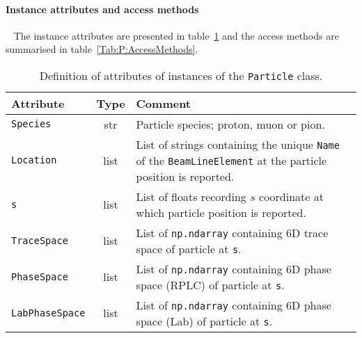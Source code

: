 \paragraph{Instance attributes and access methods} ~\newline
\label{Para:BLE:InstAttr}
\noindent
The instance attributes are presented in table~\ref{Tab:P:Attributes}
and the access methods are summarised in table~\ref{Tab:P:AccessMethods}.
\begin{table}[h]
  \caption{
    Definition of attributes of instances of the \texttt{Particle} class.
  }
  \label{Tab:P:Attributes}
  \begin{center}
    \begin{tabular}{|l|c|p{12cm}|}
      \hline
      \textbf{Attribute} & \textbf{Type} & \textbf{Comment}                                                                  \\
      \hline
      \texttt{Species}       & str   & Particle species; proton, muon or pion.                                                     \\
      \texttt{Location}      & list  & List of strings containing the unique \texttt{Name} of the \texttt{BeamLineElement} at
                                       the particle position is reported.                                                          \\
      \texttt{s}             & list  & List of floats recording $s$ coordinate at which particle position is reported.             \\
      \texttt{TraceSpace}    & list  & List of \texttt{np.ndarray} containing 6D trace space of particle at \texttt{s}.            \\
      \texttt{PhaseSpace}    & list  & List of \texttt{np.ndarray} containing 6D phase space (RPLC) of particle at \texttt{s}.     \\
      \texttt{LabPhaseSpace} & list  & List of \texttt{np.ndarray} containing 6D phase space (Lab) of particle at \texttt{s}.      \\
      \hline
    \end{tabular}
  \end{center}
\end{table}
